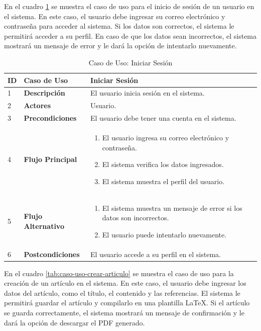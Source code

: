 En el cuadro \ref{tab:caso-uso-iniciar-sesion} se muestra el caso de uso para el inicio de sesión de un usuario en el sistema. En este caso, el usuario debe ingresar su correo electrónico y contraseña para acceder al sistema. Si los datos son correctos, el sistema le permitirá acceder a su perfil. En caso de que los datos sean incorrectos, el sistema mostrará un mensaje de error y le dará la opción de intentarlo nuevamente.

\begin{table}[H]
    \centering
        \begin{tabular}{|p{0.5cm}|p{3.5cm}|p{10cm}|}
        \hline
        \textbf{ID} & \textbf{Caso de Uso} & \textbf{Iniciar Sesión} \\
        \hline
        1 & \textbf{Descripción} & El usuario inicia sesión en el sistema. \\
        \hline
        2 & \textbf{Actores} & Usuario. \\
        \hline
        3 & \textbf{Precondiciones} & El usuario debe tener una cuenta en el sistema. \\
        \hline
        4 & \textbf{Flujo Principal} & 
        \begin{enumerate}
            \item El usuario ingresa su correo electrónico y contraseña.
            \item El sistema verifica los datos ingresados.
            \item El sistema muestra el perfil del usuario.
        \end{enumerate} \\
        \hline
        5 & \textbf{Flujo Alternativo} & 
        \begin{enumerate}
            \item El sistema muestra un mensaje de error si los datos son incorrectos.
            \item El usuario puede intentarlo nuevamente.
        \end{enumerate} \\
        \hline
        6 & \textbf{Postcondiciones} & El usuario accede a su perfil en el sistema. \\
        \hline
    \end{tabular}
    \caption{Caso de Uso: Iniciar Sesión}
    \label{tab:caso-uso-iniciar-sesion}
\end{table}

En el cuadro \ref{tab:caso-uso-crear-articulo} se muestra el caso de uso para la creación de un artículo en el sistema. En este caso, el usuario debe ingresar los datos del artículo, como el título, el contenido y las referencias. El sistema le permitirá guardar el artículo y compilarlo en una plantilla LaTeX. Si el artículo se guarda correctamente, el sistema mostrará un mensaje de confirmación y le dará la opción de descargar el PDF generado.

